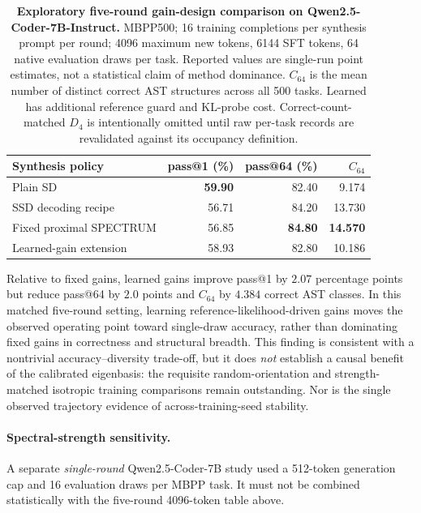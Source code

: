 \begin{table}[h]
\centering\small
\caption{\textbf{Exploratory five-round gain-design comparison
on Qwen2.5-Coder-7B-Instruct.} MBPP500; 16 training completions
per synthesis prompt per round; 4096 maximum new tokens,
6144 SFT tokens, 64 native evaluation draws per task.
Reported values are single-run point estimates, not a
statistical claim of method dominance. $C_{64}$ is the
mean number of distinct correct AST structures across
all 500 tasks. Learned has additional reference guard
and KL-probe cost. Correct-count-matched $D_4$ is
intentionally omitted until raw per-task records are
revalidated against its occupancy definition.}
\label{tab:postreview-gains}
\begin{tabular}{lrrr}
\toprule
Synthesis policy & pass@1 (\%) & pass@64 (\%) & $C_{64}$\\
\midrule
Plain SD                & \textbf{59.90} & 82.40 & 9.174\\
SSD decoding recipe     & 56.71 & 84.20 & 13.730\\
Fixed proximal SPECTRUM & 56.85 & \textbf{84.80} & \textbf{14.570}\\
Learned-gain extension  & 58.93 & 82.80 & 10.186\\
\bottomrule
\end{tabular}
\end{table}

Relative to fixed gains, learned gains improve pass@1 by
$2.07$ percentage points but reduce pass@64 by $2.0$ points
and $C_{64}$ by $4.384$ correct AST classes. In this matched
five-round setting, learning reference-likelihood-driven gains
moves the observed operating point toward single-draw accuracy,
rather than dominating fixed gains in correctness and structural
breadth. This finding is consistent with a nontrivial
accuracy--diversity trade-off, but it does \emph{not} establish
a causal benefit of the calibrated eigenbasis: the requisite
random-orientation and strength-matched isotropic training
comparisons remain outstanding. Nor is the single observed
trajectory evidence of across-training-seed stability.

\paragraph{Spectral-strength sensitivity.}
A separate \emph{single-round} Qwen2.5-Coder-7B study used a
512-token generation cap and 16 evaluation draws per MBPP task.
It must not be combined statistically with the five-round
4096-token table above.

